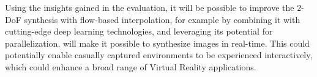 Using the insights gained in the evaluation, it will be possible to improve the 2-DoF synthesis with flow-based interpolation, for example by combining it with cutting-edge deep learning technologies, and leveraging its potential for parallelization. will make it possible to synthesize images in real-time.
This could potentially enable casually captured environments to be experienced interactively, which could enhance a broad range of Virtual Reality applications.

\begin{table}[]
\end{table}
